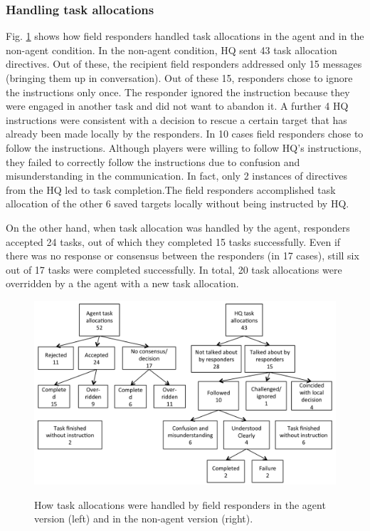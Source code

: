 \subsubsection{Handling task allocations}
Fig. \ref{fig:msgs} shows how field responders handled task allocations in the agent and in the non-agent condition. In the non-agent condition, HQ sent 43 task allocation directives. Out of these, the recipient field responders addressed only 15 messages (bringing them up in conversation). Out of these 15, responders chose to ignore the instructions only once. The responder ignored the instruction because they were engaged in another task and did not want to abandon it. A further 4 HQ instructions were consistent with a decision to rescue a certain target that has already been made locally by the responders. In 10 cases field responders chose to follow the instructions. Although players were willing to follow HQ's instructions, they failed to correctly follow the instructions due to confusion and misunderstanding in the communication. In fact, only 2 instances of directives from the HQ led to task completion.The field responders accomplished task allocation of the other 6 saved targets locally without being instructed by HQ.

On the other hand, when task allocation was handled by the agent, responders accepted 24 tasks, out of which they completed 15 tasks successfully. Even if there was no response or consensus between the responders (in 17 cases), still six out of 17 tasks were completed successfully. In total, 20 task allocations were overridden by a the agent with a new task allocation. 

\begin{figure}[htbp]
\includegraphics[width=\columnwidth]{message_handling.png}
\label{fig:msgs}
\caption{How task allocations were handled by field responders in the agent version (left) and in the non-agent version (right).}
\end{figure}

